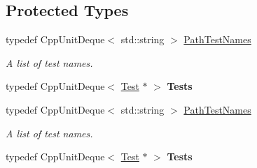 \subsection*{Protected Types}
\begin{DoxyCompactItemize}
\item 
\hypertarget{class_test_path_a525c33f5b897710bf37cf593160e562a}{typedef Cpp\+Unit\+Deque$<$ std\+::string $>$ \hyperlink{class_test_path_a525c33f5b897710bf37cf593160e562a}{Path\+Test\+Names}}\label{class_test_path_a525c33f5b897710bf37cf593160e562a}

\begin{DoxyCompactList}\small\item\em A list of test names. \end{DoxyCompactList}\item 
\hypertarget{class_test_path_aa1f2a0a7e01597a16ed041776297fbdf}{typedef Cpp\+Unit\+Deque$<$ \hyperlink{class_test}{Test} $\ast$ $>$ {\bfseries Tests}}\label{class_test_path_aa1f2a0a7e01597a16ed041776297fbdf}

\item 
\hypertarget{class_test_path_a525c33f5b897710bf37cf593160e562a}{typedef Cpp\+Unit\+Deque$<$ std\+::string $>$ \hyperlink{class_test_path_a525c33f5b897710bf37cf593160e562a}{Path\+Test\+Names}}\label{class_test_path_a525c33f5b897710bf37cf593160e562a}

\begin{DoxyCompactList}\small\item\em A list of test names. \end{DoxyCompactList}\item 
\hypertarget{class_test_path_aa1f2a0a7e01597a16ed041776297fbdf}{typedef Cpp\+Unit\+Deque$<$ \hyperlink{class_test}{Test} $\ast$ $>$ {\bfseries Tests}}\label{class_test_path_aa1f2a0a7e01597a16ed041776297fbdf}

\end{DoxyCompactItemize}
